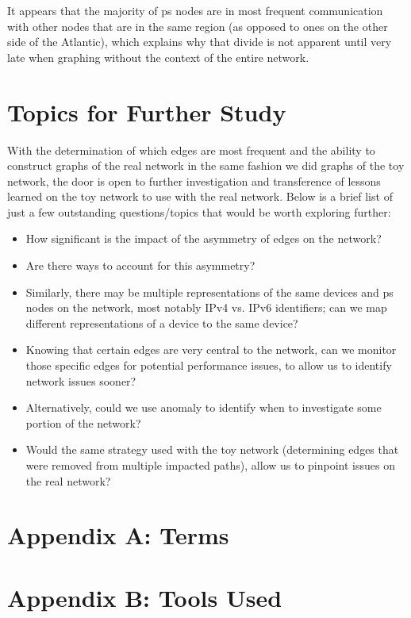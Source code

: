 \documentclass{finalreport}
\begin{document}
It appears that the majority of \gls{ps} nodes are in most frequent communication with other nodes that are in the same region (as opposed to ones on the other side of the Atlantic), which explains why that divide is not apparent until very late when graphing without the context of the entire network. 

\pagebreak
\section*{Topics for Further Study}

With the determination of which edges are most frequent and the ability to construct graphs of the real network in the same fashion we did graphs of the toy network, the door is open to further investigation and transference of lessons learned on the toy network to use with the real network. Below is a brief list of just a few outstanding questions/topics that would be worth exploring further:

\begin{itemize}
	\item How significant is the impact of the asymmetry of edges on the network?
	\item Are there ways to account for this asymmetry?
	\item Similarly, there may be multiple representations of the same devices and \gls{ps} nodes on the network, most notably IPv4 vs. IPv6 identifiers; can we map different representations of a device to the same device?
	\item Knowing that certain edges are very central to the network, can we monitor those specific edges for potential performance issues, to allow us to identify network issues sooner?
	\item Alternatively, could we use \gls{anomaly} to identify when to investigate some portion of the network?
	\item Would the same strategy used with the toy network (determining edges that were removed from multiple impacted paths), allow us to pinpoint issues on the real network?
\end{itemize}

\pagebreak
\section{Appendix A: Terms}\label{app:gloss}

\printnoidxglossaries

\section{Appendix B: Tools Used}\label{app:tools}
\end{document}
